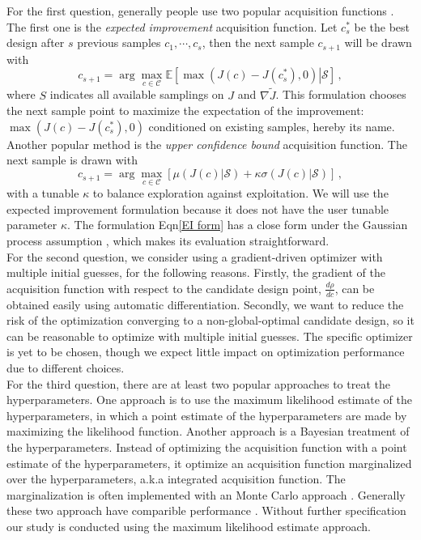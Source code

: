 \documentclass[a4paper,onecolumn]{article}
\theoremstyle{remark}
\begin{document}
\noindent For the first question, generally people use two popular acquisition functions
\cite{practicalBayesianopt}.
The first one is the \emph{expected improvement} acquisition function.
Let $c^*_s$ be the best design after $s$ previous samples $c_1, \cdots, c_s$, then the next sample 
$c_{s+1}$ will be drawn with
\begin{equation}
    c_{s+1} = \arg\max_{c\in\mathcal{C}} \mathbb{E}
    \left[\left. \max\left(J(c) - J(c^*_s), 0\right) \right| \mathcal{S}\right]\,,
    \label{EI form}
\end{equation}
where $S$ indicates all available samplings on $J$ and $\nabla \tilde{J}$.
This formulation chooses the next sample point to maximize the expectation of
the improvement: $\max \left(J(c) - J(c^*_s) , 0\right)$ conditioned on existing
samples, hereby its name.
Another popular method is the \emph{upper confidence bound} acquisition function.
The next sample is drawn with
\begin{equation}
    c_{s+1} = \arg\max_{c\in\mathcal{C}} \left[ \mu(J(c)\big|\mathcal{S}) +\kappa \sigma(J(c)\big|\mathcal{S}) \right]\,,
\end{equation}
with a tunable $\kappa$ to balance exploration against exploitation. We will
use the expected improvement formulation because it does not have the user tunable
parameter $\kappa$. The formulation Eqn\eqref{EI form} has a close form under the Gaussian process
assumption \cite{practicalBayesianopt}, which makes its evaluation straightforward. 
\\

\noindent For the second question, we consider using a gradient-driven optimizer
with multiple initial guesses, for the following reasons. Firstly, the gradient of the 
acquisition function with respect to the candidate design point, $\frac{d\rho}{dc}$,
can be obtained easily using automatic differentiation. Secondly, we want to
reduce the risk of the optimization converging to a non-global-optimal candidate design,
so it can be reasonable to optimize with multiple initial guesses.
The specific optimizer is yet to be chosen, though we expect little impact 
on optimization performance
due to different choices.
\\

\noindent For the third question, there are at least two popular approaches to treat
the hyperparameters. One approach is to use the maximum likelihood estimate of the
hyperparameters, in which a point estimate of the hyperparameters are made by maximizing 
the likelihood function. Another approach is a Bayesian treatment of the hyperparameters.
Instead of optimizing the acquisition function with a point estimate of the hyperparameters,
it optimize an acquisition function marginalized over the hyperparameters, a.k.a 
integrated acquisition function. The marginalization is often implemented with an Monte
Carlo approach \cite{MCMC hyperparameters}. Generally these two approach have comparible 
performance \cite{practicalBayesianopt}. 
Without further specification our study is conducted using the maximum likelihood
estimate approach.
\\
\end{document}
